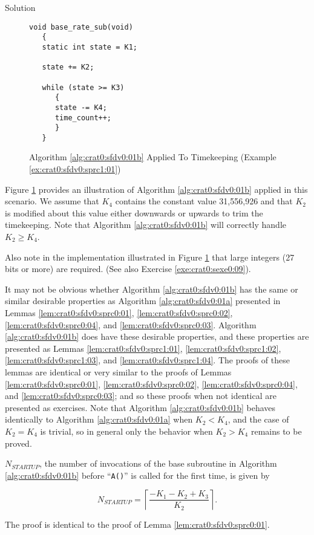 \begin{vworkexampleparsection}{Solution}
\begin{figure}
\begin{verbatim}
void base_rate_sub(void)
   {
   static int state = K1;

   state += K2;

   while (state >= K3)
      {
      state -= K4;
      time_count++;
      }
   }
\end{verbatim}
\caption{Algorithm \ref{alg:crat0:sfdv0:01b} Applied To Timekeeping
         (Example \ref{ex:crat0:sfdv0:sprc1:01})}
\label{fig:ex:crat0:sfdv0:sprc1:01:01}
\end{figure}

Figure \ref{fig:ex:crat0:sfdv0:sprc1:01:01} provides an illustration
of Algorithm \ref{alg:crat0:sfdv0:01b} applied in this scenario.
We assume that $K_4$ contains the constant value 31,556,926
and that $K_2$ is modified about this value either downwards or upwards
to trim the timekeeping.  Note that Algorithm \ref{alg:crat0:sfdv0:01b} will correctly
handle $K_2 \geq K_4$.

Also note in the implementation illustrated in Figure 
\ref{fig:ex:crat0:sfdv0:sprc1:01:01} that large integers (27 bits or more)
are required.  (See also Exercise \ref{exe:crat0:sexe0:09}).
\end{vworkexampleparsection}
\vworkexamplefooter{}

It may not be obvious whether Algorithm \ref{alg:crat0:sfdv0:01b} has the
same or similar desirable properties as Algorithm \ref{alg:crat0:sfdv0:01a}
presented
in Lemmas 
\ref{lem:crat0:sfdv0:sprc0:01}, 
\ref{lem:crat0:sfdv0:sprc0:02},
\ref{lem:crat0:sfdv0:sprc0:04},
and 
\ref{lem:crat0:sfdv0:sprc0:03}.
Algorithm \ref{alg:crat0:sfdv0:01b} does have these desirable
properties, and these properties are presented as
Lemmas \ref{lem:crat0:sfdv0:sprc1:01}, 
\ref{lem:crat0:sfdv0:sprc1:02},
\ref{lem:crat0:sfdv0:sprc1:03}, and
\ref{lem:crat0:sfdv0:sprc1:04}.
The proofs of these lemmas are identical or very similar to the proofs
of Lemmas
\ref{lem:crat0:sfdv0:sprc0:01}, 
\ref{lem:crat0:sfdv0:sprc0:02},
\ref{lem:crat0:sfdv0:sprc0:04},
and 
\ref{lem:crat0:sfdv0:sprc0:03}; 
and so these proofs when not identical are presented as exercises.
Note that Algorithm \ref{alg:crat0:sfdv0:01b} behaves identically to 
Algorithm \ref{alg:crat0:sfdv0:01a} when $K_2 < K_4$, and the
case of $K_2=K_4$ is trivial, so in general only
the behavior when $K_2 > K_4$ remains to be proved.

\begin{vworklemmastatement}
\label{lem:crat0:sfdv0:sprc1:01}
$N_{STARTUP}$, the number of invocations of the base subroutine
in Algorithm \ref{alg:crat0:sfdv0:01b} before ``\texttt{A()}'' is called
for the first time, is given by

\begin{equation}
\label{eq:lem:crat0:sfdv0:sprc1:01:01}
N_{STARTUP} = 
\left\lceil
{
\frac{-K_1 - K_2 + K_3}{K_2}
}
\right\rceil .
\end{equation} 
\end{vworklemmastatement}
\begin{vworklemmaproof}
The proof is identical to the proof of Lemma
\ref{lem:crat0:sfdv0:sprc0:01}.
\end{vworklemmaproof}


